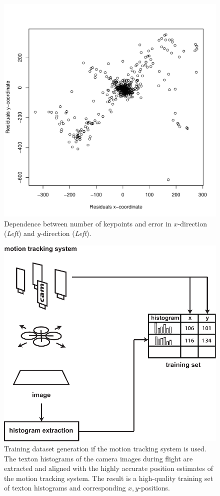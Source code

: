 \documentclass{report}
\begin{document}
\begin{figure}[h!]
\label{fig:measurementmodel}
\begin{center}
\includegraphics[width=0.448\columnwidth]{measurement_model}
\caption{{Dependence between number of keypoints and error in
    $x$-direction (\emph{Left}) and $y$-direction (\emph{Left}).%
  }}
\end{center}
\end{figure}

\begin{figure}[h!]
\begin{center}
\includegraphics[width=0.56\columnwidth]{overview_new}
\caption{{Training dataset generation if the motion tracking system is
    used. The texton histograms of the camera images during flight are
    extracted and aligned with the highly accurate position estimates
    of the motion tracking system. The result is a high-quality
    training set of texton histograms and corresponding
    $x,y$-positions.%
  }}
\end{center}
\end{figure}
\end{document}
